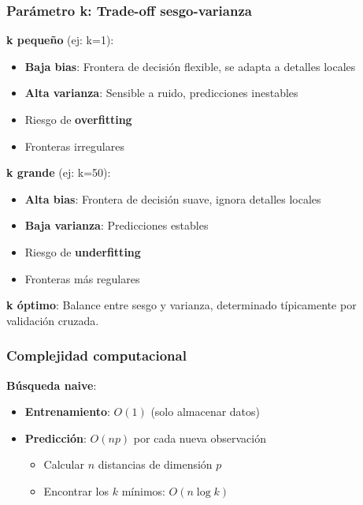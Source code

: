 \documentclass[
  doc,
  floatsintext,
  longtable,
  a4paper,
  nolmodern,
  notxfonts,
  notimes,
  12pt,
  colorlinks=true,linkcolor=blue,citecolor=blue,urlcolor=blue]{apa7}
\providecommand{\tightlist}{%
  \setlength{\itemsep}{0pt}\setlength{\parskip}{0pt}}
\begin{document}
\subsubsection{Parámetro k: Trade-off
sesgo-varianza}\label{paruxe1metro-k-trade-off-sesgo-varianza}

\textbf{k pequeño} (ej: k=1):

\begin{itemize}
\tightlist
\item
  \textbf{Baja bias}: Frontera de decisión flexible, se adapta a
  detalles locales
\item
  \textbf{Alta varianza}: Sensible a ruido, predicciones inestables
\item
  Riesgo de \textbf{overfitting}
\item
  Fronteras irregulares
\end{itemize}

\textbf{k grande} (ej: k=50):

\begin{itemize}
\tightlist
\item
  \textbf{Alta bias}: Frontera de decisión suave, ignora detalles
  locales
\item
  \textbf{Baja varianza}: Predicciones estables
\item
  Riesgo de \textbf{underfitting}
\item
  Fronteras más regulares
\end{itemize}

\textbf{k óptimo}: Balance entre sesgo y varianza, determinado
típicamente por validación cruzada.

\subsubsection{Complejidad
computacional}\label{complejidad-computacional}

\textbf{Búsqueda naive}:

\begin{itemize}
\tightlist
\item
  \textbf{Entrenamiento}: \(O(1)\) (solo almacenar datos)
\item
  \textbf{Predicción}: \(O(np)\) por cada nueva observación

  \begin{itemize}
  \tightlist
  \item
    Calcular \(n\) distancias de dimensión \(p\)
  \item
    Encontrar los \(k\) mínimos: \(O(n \log k)\)
  \end{itemize}
\end{itemize}
\end{document}
